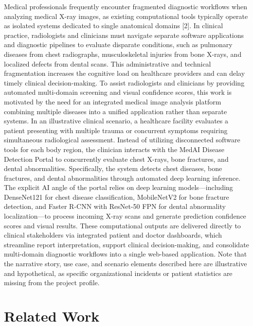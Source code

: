 \documentclass[conference]{IEEEtran}
\begin{document}
Medical professionals frequently encounter fragmented diagnostic workflows when analyzing medical X-ray images, as existing computational tools typically operate as isolated systems dedicated to single anatomical domains [2]. In clinical practice, radiologists and clinicians must navigate separate software applications and diagnostic pipelines to evaluate disparate conditions, such as pulmonary diseases from chest radiographs, musculoskeletal injuries from bone X-rays, and localized defects from dental scans. This administrative and technical fragmentation increases the cognitive load on healthcare providers and can delay timely clinical decision-making. To assist radiologists and clinicians by providing automated multi-domain screening and visual confidence scores, this work is motivated by the need for an integrated medical image analysis platform combining multiple diseases into a unified application rather than separate systems. In an illustrative clinical scenario, a healthcare facility evaluates a patient presenting with multiple trauma or concurrent symptoms requiring simultaneous radiological assessment. Instead of utilizing disconnected software tools for each body region, the clinician interacts with the MedAI Disease Detection Portal to concurrently evaluate chest X-rays, bone fractures, and dental abnormalities. Specifically, the system detects chest diseases, bone fractures, and dental abnormalities through automated deep learning inference. The explicit AI angle of the portal relies on deep learning models—including DenseNet121 for chest disease classification, MobileNetV2 for bone fracture detection, and Faster R-CNN with ResNet-50 FPN for dental abnormality localization—to process incoming X-ray scans and generate prediction confidence scores and visual results. These computational outputs are delivered directly to clinical stakeholders via integrated patient and doctor dashboards, which streamline report interpretation, support clinical decision-making, and consolidate multi-domain diagnostic workflows into a single web-based application. Note that the narrative story, use case, and scenario elements described here are illustrative and hypothetical, as specific organizational incidents or patient statistics are missing from the project profile.

\section{Related Work}
\end{document}
